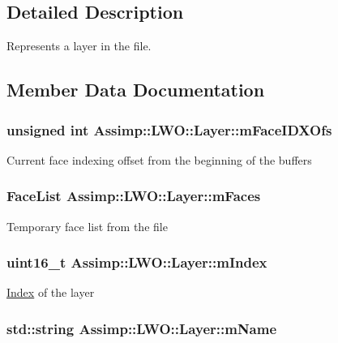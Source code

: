 \subsection{Detailed Description}
Represents a layer in the file. 

\subsection{Member Data Documentation}
\hypertarget{struct_assimp_1_1_l_w_o_1_1_layer_a9aff9f3132ceec8b12dfc8f5681d8f86}{
\subsubsection[{m\+Face\+I\+D\+X\+Ofs}]{\setlength{\rightskip}{0pt plus 5cm}unsigned int Assimp\+::\+L\+W\+O\+::\+Layer\+::m\+Face\+I\+D\+X\+Ofs}}\label{struct_assimp_1_1_l_w_o_1_1_layer_a9aff9f3132ceec8b12dfc8f5681d8f86}
Current face indexing offset from the beginning of the buffers \hypertarget{struct_assimp_1_1_l_w_o_1_1_layer_a5218ce3bb5552e4e7dab9510f6324be9}{
\subsubsection[{m\+Faces}]{\setlength{\rightskip}{0pt plus 5cm}Face\+List Assimp\+::\+L\+W\+O\+::\+Layer\+::m\+Faces}}\label{struct_assimp_1_1_l_w_o_1_1_layer_a5218ce3bb5552e4e7dab9510f6324be9}
Temporary face list from the file \hypertarget{struct_assimp_1_1_l_w_o_1_1_layer_ab4323f40fb04e78164194340c283d0f4}{
\subsubsection[{m\+Index}]{\setlength{\rightskip}{0pt plus 5cm}uint16\+\_\+t Assimp\+::\+L\+W\+O\+::\+Layer\+::m\+Index}}\label{struct_assimp_1_1_l_w_o_1_1_layer_ab4323f40fb04e78164194340c283d0f4}
\hyperlink{struct_index}{Index} of the layer \hypertarget{struct_assimp_1_1_l_w_o_1_1_layer_a3bfa18df0c9b77be857aba7cc1d7b09d}{
\subsubsection[{m\+Name}]{\setlength{\rightskip}{0pt plus 5cm}std\+::string Assimp\+::\+L\+W\+O\+::\+Layer\+::m\+Name}}\label{struct_assimp_1_1_l_w_o_1_1_layer_a3bfa18df0c9b77be857aba7cc1d7b09d}

